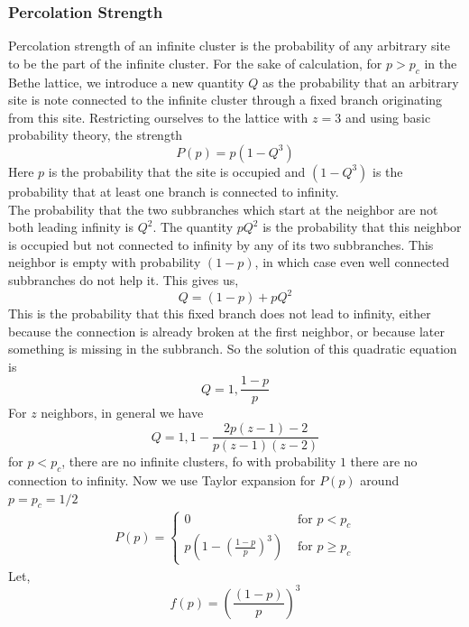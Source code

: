 	\subsubsection{Percolation Strength}
	Percolation strength of an infinite cluster is the probability of any arbitrary site to be the part of the infinite cluster. For the sake of calculation, for $p>p_c$ in the Bethe lattice, we introduce a new quantity $Q$ as the probability that an arbitrary site is note connected to the infinite cluster through a fixed branch originating from this site. Restricting ourselves to the lattice with $z=3$ and using basic probability theory, the strength 
	\begin{equation}
		P(p) = p(1-Q^3)
	\end{equation}
	Here $p$ is the probability that the site is occupied and $(1-Q^3)$ is the probability that at least one branch is connected to infinity.\\
	The probability that the two subbranches which start at the neighbor are not both leading infinity is	$Q^2$. The quantity $pQ^2$ is the probability that this neighbor is occupied but not connected to infinity	by any of its two subbranches. This neighbor is empty with probability $(1-p)$, in which case even	well connected subbranches do not help it. This gives us,
	\begin{equation}
		Q = (1-p) + p Q^2
	\end{equation}
	This is the probability that this fixed branch does not lead to infinity, either because the connection	is already broken at the first neighbor, or because later something is missing in the subbranch. So the solution of this quadratic equation is
	\begin{equation}
		Q = 1, \frac{1-p}{p}
	\end{equation}
	For $z$ neighbors, in general we have
	\begin{equation}
		Q = 1, 1 - \frac{2p(z-1)-2}{p(z-1)(z-2)}
	\end{equation}
	for $p<p_c$, there are no infinite clusters, fo with probability $1$ there are no connection to infinity. Now we use Taylor expansion for $P(p)$ around $p=p_c=1/2$
	\begin{align}
		P(p) = 
		\begin{cases}
		0	&\text{ for } p < p_c \\
		p\left(1- \left(\frac{1-p}{p}\right)^3\right) &\text{ for } p \geq p_c
		\end{cases}
	\end{align}
	Let,
	\begin{equation}
		f(p) = \left(\frac{(1-p)}{p} \right)^3
	\end{equation}

